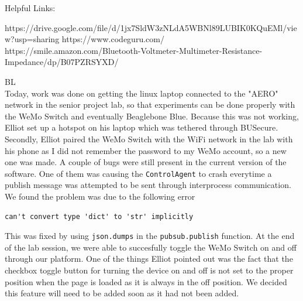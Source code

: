\documentclass[fontsize=11pt, %
                             paper=letter, %
                             openany, %
                             captions=tableheading,
                             index=totoc,
                             hyperref]{labbook}
\begin{document}
Helpful Links:

https://drive.google.com/file/d/1jx7SldW3zNLdA5WBNl89LUBIK0KQuEMl/view?usp=sharing
https://www.codeguru.com/
https://smile.amazon.com/Bluetooth-Voltmeter-Multimeter-Resistance-Impedance/dp/B07PZRSYXD/


BL\\
Today, work was done on getting the linux laptop connected to the "AERO" network in the senior project lab, so that experiments can be done properly with the WeMo Switch and eventually Beaglebone Blue. Because this was not working, Elliot set up a hotspot on his laptop which was tethered through BUSecure. Secondly, Elliot paired the WeMo Switch with the WiFi network in the lab with his phone as I did not remember the password to my WeMo account, so a new one was made. A couple of bugs were still present in the current version of the software. One of them was causing the \texttt{ControlAgent} to crash everytime a publish message was attempted to be sent through interprocess communication. We found the problem was due to the following error
\begin{Verbatim}
can't convert type 'dict' to 'str' implicitly
\end{Verbatim} 
This was fixed by using \texttt{json.dumps} in the \texttt{pubsub.publish} function. At the end of the lab session, we were able to succesfully toggle the WeMo Switch on and off through our platform. One of the things Elliot pointed out was the fact that the checkbox toggle button for turning the device on and off is not set to the proper position when the page is loaded as it is always in the off position. We decided this feature will need to be added soon as it had not been added.

\end{document}
